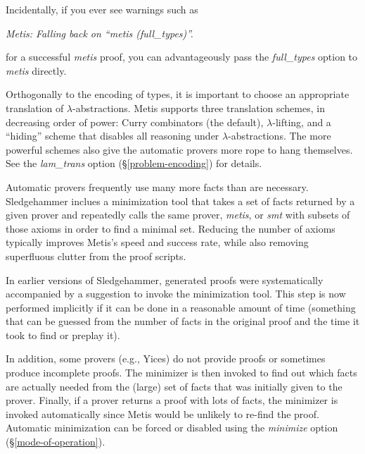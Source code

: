 \documentclass[a4paper,12pt]{article}
\begin{document}
Incidentally, if you ever see warnings such as

\prew
\slshape
Metis: Falling back on ``\textit{metis} (\textit{full\_types})''.
\postw

for a successful \textit{metis} proof, you can advantageously pass the
\textit{full\_types} option to \textit{metis} directly.


Orthogonally to the encoding of types, it is important to choose an appropriate
translation of $\lambda$-abstractions. Metis supports three translation schemes,
in decreasing order of power: Curry combinators (the default),
$\lambda$-lifting, and a ``hiding'' scheme that disables all reasoning under
$\lambda$-abstractions. The more powerful schemes also give the automatic
provers more rope to hang themselves. See the \textit{lam\_trans} option (\S\ref{problem-encoding}) for details.


Automatic provers frequently use many more facts than are necessary.
Sledgehammer inclues a minimization tool that takes a set of facts returned by a
given prover and repeatedly calls the same prover, \textit{metis}, or
\textit{smt} with subsets of those axioms in order to find a minimal set.
Reducing the number of axioms typically improves Metis's speed and success rate,
while also removing superfluous clutter from the proof scripts.

In earlier versions of Sledgehammer, generated proofs were systematically
accompanied by a suggestion to invoke the minimization tool. This step is now
performed implicitly if it can be done in a reasonable amount of time (something
that can be guessed from the number of facts in the original proof and the time
it took to find or preplay it).

In addition, some provers (e.g., Yices) do not provide proofs or sometimes
produce incomplete proofs. The minimizer is then invoked to find out which facts
are actually needed from the (large) set of facts that was initially given to
the prover. Finally, if a prover returns a proof with lots of facts, the
minimizer is invoked automatically since Metis would be unlikely to re-find the
proof.
%
Automatic minimization can be forced or disabled using the \textit{minimize}
option (\S\ref{mode-of-operation}).

\end{document}
